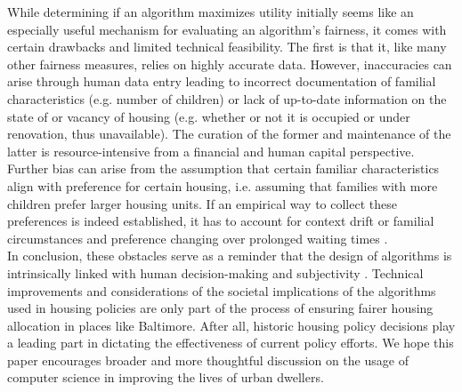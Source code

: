 \documentclass[11pt]{article}
\begin{document}
While determining if an algorithm maximizes utility initially seems like an especially useful mechanism for evaluating an algorithm’s fairness, it comes with certain drawbacks and limited technical feasibility. The first is that it, like many other fairness measures, relies on highly accurate data. However, inaccuracies can arise through human data entry leading to incorrect documentation of familial characteristics (e.g. number of children) or lack of up-to-date information on the state of or vacancy of housing (e.g. whether or not it is occupied or under renovation, thus unavailable). The curation of the former and maintenance of the latter is resource-intensive from a financial and human capital perspective. \\
\newline
Further bias can arise from the assumption that certain familiar characteristics align with preference for certain housing, i.e. assuming that families with more children prefer larger housing units. If an empirical way to collect these preferences is indeed established, it has to account for context drift or familial circumstances and preference changing over prolonged waiting times \cite{conceptdrift}. \\
\newline
In conclusion, these obstacles serve as a reminder that the design of algorithms is intrinsically linked with human decision-making and subjectivity \cite{humanerror}. Technical improvements and considerations of the societal implications of the algorithms used in housing policies are only part of the process of ensuring fairer housing allocation in places like Baltimore. After all, historic housing policy decisions play a leading part in dictating the effectiveness of current policy efforts. We hope this paper encourages broader and more thoughtful discussion on the usage of computer science in improving the lives of urban dwellers. 


\newpage

 
\end{document}
